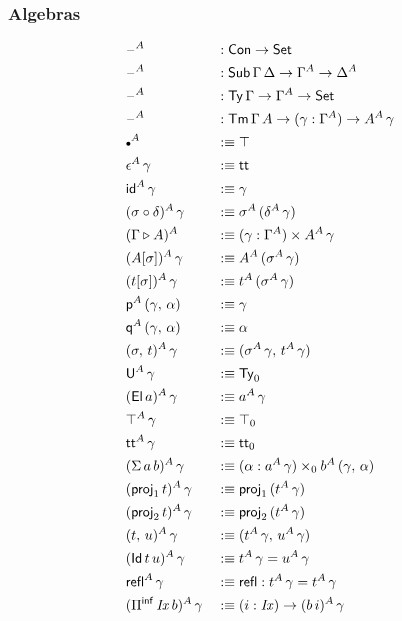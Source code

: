 \documentclass[12pt,a4paper,twoside,openany]{book}
\theoremstyle{remark}
\theoremstyle{definition}
\theoremstyle{theorem}
\newcommand{\mi}[1]{\mathit{#1}}
\newcommand{\refl}{\mathsf{refl}}
\newcommand{\id}{\mathsf{id}}
\newcommand{\Con}{\mathsf{Con}}
\newcommand{\Sub}{\mathsf{Sub}}
\newcommand{\Tm}{\mathsf{Tm}}
\newcommand{\Ty}{\mathsf{Ty}}
\newcommand{\U}{\mathsf{U}}
\newcommand{\El}{\mathsf{El}}
\newcommand{\Id}{\mathsf{Id}}
\newcommand{\proj}{\mathsf{proj}}
\renewcommand{\tt}{\mathsf{tt}}
\newcommand{\blank}{\mathord{\hspace{1pt}\text{--}\hspace{1pt}}}
\newcommand{\Set}{\mathsf{Set}}
\newcommand{\ext}{\triangleright}
\newcommand{\emptycon}{\scaleobj{.75}\bullet}
\newcommand{\Piinf}{\Pi^{\mathsf{inf}}}
\newcommand{\p}{\mathsf{p}}
\newcommand{\q}{\mathsf{q}}
\newcommand{\defn}{:\equiv}
\begin{document}
\subsubsection{Algebras}
\vspace{-0.5em}
\begin{alignat*}{3}
  &\blank^A &&: \Con \to \Set\\
  &\blank^A &&: \Sub\,\Gamma\,\Delta \to \Gamma^A \to \Delta^A\\
  &\blank^A &&: \Ty\,\Gamma \to \Gamma^A \to \Set\\
  &\blank^A &&: \Tm\,\Gamma\,A \to (\gamma : \Gamma^A) \to A^A\,\gamma\\
  &\emptycon^A &&\defn \top\\
  &\epsilon^A\,\gamma &&\defn \tt\\
  &\id^A\,\gamma &&\defn \gamma\\
  &(\sigma \circ \delta)^A\,\gamma &&\defn \sigma^A\,(\delta^A\,\gamma)\\
  &(\Gamma \ext A)^A &&\defn (\gamma : \Gamma^A) \times A^A\,\gamma\\
  &(A[\sigma])^A\,\gamma &&\defn A^A\,(\sigma^A\,\gamma)\\
  &(t[\sigma])^A\,\gamma &&\defn t^A\,(\sigma^A\,\gamma)\\
  &\p^A\,(\gamma,\,\alpha) &&\defn \gamma\\
  &\q^A\,(\gamma,\,\alpha) &&\defn \alpha\\
  &(\sigma,\,t)^A\,\gamma &&\defn (\sigma^A\,\gamma,\,t^A\,\gamma)\\
  &\U^A\,\gamma &&\defn \Ty_0\\
  &(\El\,a)^A\,\gamma &&\defn a^A\,\gamma\\
  &\top^A\,\gamma &&\defn \top_0\\
  &\tt^A\,\gamma &&\defn \tt_0\\
  &(\Sigma\,a\,b)^A\,\gamma &&\defn (\alpha : a^A\,\gamma) \times_0 b^A\,(\gamma,\,\alpha)\\
  &(\proj_1\,t)^A\,\gamma &&\defn \proj_1\,(t^A\,\gamma)\\
  &(\proj_2\,t)^A\,\gamma &&\defn \proj_2\,(t^A\,\gamma)\\
  &(t,\,u)^A\,\gamma &&\defn (t^A\,\gamma,\,u^A\,\gamma)\\
  &(\Id\,t\,u)^A\,\gamma &&\defn t^A\,\gamma = u^A\,\gamma\\
  &\refl^A\,\gamma &&\defn \refl : t^A\,\gamma = t^A\,\gamma\\
  &(\Piinf\,\mi{Ix}\,b)^A\,\gamma &&\defn (i : \mi{Ix}) \to (b\,i)^A\,\gamma\\

\end{alignat*}
\end{document}
